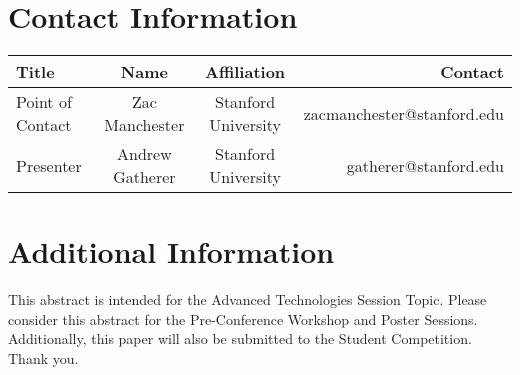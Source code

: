 \documentclass{article}
\begin{document}
\section{Contact Information}
\begin{tabular}{l | c | c | r}
	\hline
	Title & Name & Affiliation & Contact\\
	\hline
	Point of Contact & Zac Manchester & Stanford University & zacmanchester@stanford.edu\\
	Presenter & Andrew Gatherer & Stanford University & gatherer@stanford.edu\\
\end{tabular}
	
\section{Additional Information}
This abstract is intended for the Advanced Technologies Session Topic. Please consider this abstract for the Pre-Conference Workshop and Poster Sessions. Additionally, this paper will also be submitted to the Student Competition. Thank you. 
\end{document}
